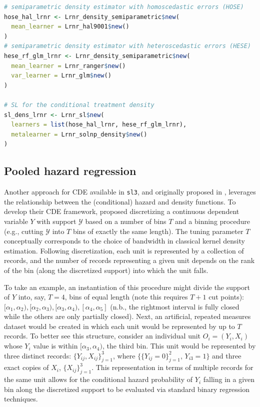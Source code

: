 \documentclass[
  12pt, krantz2,
]{krantz}
\newcommand{\passthrough}[1]{#1}
\newcommand{\1}{\mathbbm{1}}
\theoremstyle{definition}
\theoremstyle{definition}
\theoremstyle{definition}
\theoremstyle{definition}
\theoremstyle{remark}
\begin{document}
\begin{lstlisting}[language=R]
# semiparametric density estimator with homoscedastic errors (HOSE)
hose_hal_lrnr <- Lrnr_density_semiparametric$new(
  mean_learner = Lrnr_hal9001$new()
)
# semiparametric density estimator with heteroscedastic errors (HESE)
hese_rf_glm_lrnr <- Lrnr_density_semiparametric$new(
  mean_learner = Lrnr_ranger$new()
  var_learner = Lrnr_glm$new()
)

# SL for the conditional treatment density
sl_dens_lrnr <- Lrnr_sl$new(
  learners = list(hose_hal_lrnr, hese_rf_glm_lrnr),
  metalearner = Lrnr_solnp_density$new()
)
\end{lstlisting}

\hypertarget{pooled-hazard-regression}{%
\subsection{Pooled hazard regression}\label{pooled-hazard-regression}}

Another approach for CDE available in \passthrough{\lstinline!sl3!}, and originally proposed in
\citet{diaz2011super}, leverages the relationship between the (conditional) hazard and
density functions. To develop their CDE framework, \citet{diaz2011super} proposed
discretizing a continuous dependent variable \(Y\) with support \(\mathcal{Y}\)
based on a number of bins \(T\) and a binning procedure (e.g., cutting
\(\mathcal{Y}\) into \(T\) bins of exactly the same length). The tuning parameter
\(T\) conceptually corresponds to the choice of bandwidth in classical kernel
density estimation. Following discretization, each unit is represented by a
collection of records, and the number of records representing a given unit
depends on the rank of the bin (along the discretized support) into which the
unit falls.

To take an example, an instantiation of this procedure might divide the support
of \(Y\) into, say, \(T = 4\), bins of equal length (note this requires \(T+1\) cut
points): \([\alpha_1, \alpha_2), [\alpha_2, \alpha_3), [\alpha_3, \alpha_4), [\alpha_4, \alpha_5]\) (n.b., the rightmost interval is fully closed while the
others are only partially closed). Next, an artificial, repeated measures
dataset would be created in which each unit would be represented by up to \(T\)
records. To better see this structure, consider an individual unit \(O_i = (Y_i, X_i)\) whose \(Y_i\) value is within \([\alpha_3, \alpha_4)\), the third bin. This
unit would be represented by three distinct records: \(\{Y_{ij}, X_{ij}\}_{j=1}^3\), where \(\{\{Y_{ij} = 0\}_{j=1}^2\), \(Y_{i3} = 1\}\) and three
exact copies of \(X_i\), \(\{X_{ij}\}_{j=1}^3\). This representation in terms of
multiple records for the same unit allows for the conditional hazard probability
of \(Y_i\) falling in a given bin along the discretized support to be evaluated
via standard binary regression techniques.
\end{document}
